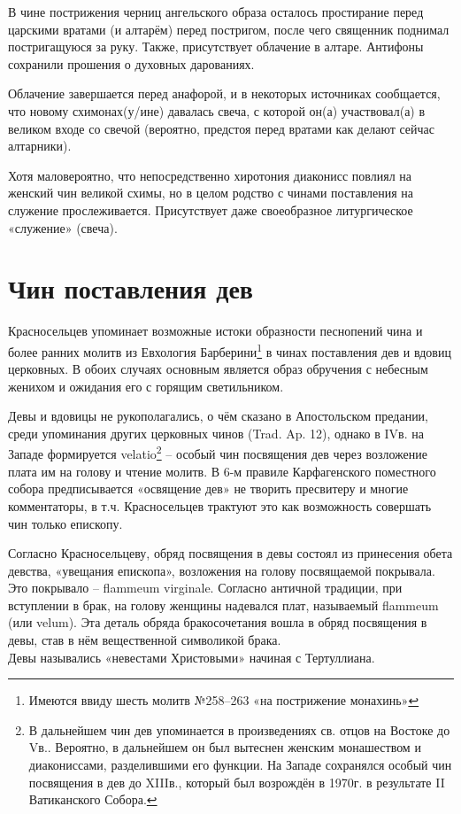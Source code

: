 В чине пострижения черниц ангельского образа осталось простирание перед царскими вратами (и алтарём) перед постригом, после чего священник поднимал постригащуюся за руку.
Также, присутствует облачение в алтаре.
Антифоны сохранили прошения о духовных дарованиях.

Облачение завершается перед анафорой, и в некоторых источниках сообщается, что новому схимонах(у/ине) давалась свеча, с которой он(а) участвовал(а) в великом входе со свечой\cite{palmov.postrijeniye.1914} (вероятно, предстоя перед вратами как делают сейчас алтарники).

Хотя маловероятно, что непосредственно хиротония диаконисс повлиял на женский чин великой схимы, но в целом родство с чинами поставления на служение прослеживается.
Присутствует даже своеобразное литургическое «служение» (свеча).

\section*{Чин поставления дев}\label{ux447ux438ux43d-ux43fux43eux441ux442ux430ux432ux43bux435ux43dux438ux44f-ux434ux435ux432}

Красносельцев упоминает возможные истоки образности песнопений чина и более ранних молитв из Евхология Барберини\footnote{Имеются ввиду шесть молитв №258--263 «на пострижение монахинь»\cite[С.~176–178]{barberini.evhologiy.2011}} в чинах поставления дев и вдовиц церковных\cite[С.~145–146]{krasnoseltcev.uprazdnenniye.1889}.
В обоих случаях основным является образ обручения с небесным женихом и ожидания его с горящим светильником.

Девы и вдовицы не рукополагались, о чём сказано в Апостольском предании, среди упоминания других церковных чинов (Trad. Ap. 12), однако в IVв. на Западе формируется velatio\footnote{В дальнейшем чин дев упоминается в произведениях св. отцов на Востоке до Vв.. Вероятно, в дальнейшем он был вытеснен женским монашеством и диакониссами, разделившими его функции. На Западе сохранялся особый чин посвящения в дев до XIIIв., который был возрождён в 1970г. в результате II Ватиканского Собора.} -- особый чин посвящения дев через возложение плата им на голову и чтение молитв\cite{pravenc.devy.20}.
В 6-м правиле Карфагенского поместного собора предписывается «освящение дев» не творить пресвитеру и многие комментаторы, в т.ч. Красносельцев трактуют это как возможность совершать чин только епископу.

Согласно Красносельцеву, обряд посвящения в девы состоял из принесения обета девства, «увещания епископа», возложения на голову посвящаемой покрывала.
Это покрывало -- flammeum virginale.
Согласно античной традиции, при вступлении в брак, на голову женщины надевался плат, называемый flammeum (или velum).
Эта деталь обряда бракосочетания вошла в обряд посвящения в девы, став в нём вещественной символикой брака.\\
Девы назывались «невестами Христовыми» начиная с Тертуллиана.

